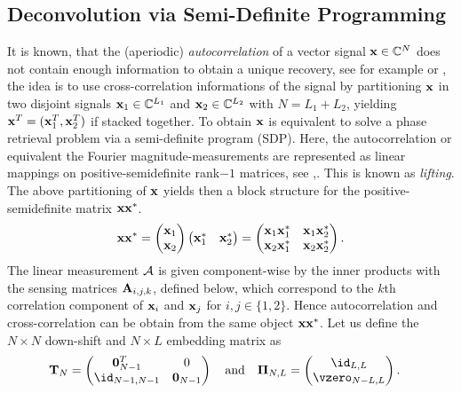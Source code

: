 \documentclass[conference]{IEEEtran}
\begin{document}
\subsection{Deconvolution via Semi-Definite Programming} It is known, that the (aperiodic) \emph{autocorrelation}
of a vector signal ${\mathbf x}\in{\ensuremath{\mathbb C}}^N$ does not contain enough information to obtain a unique recovery, see for example
\cite{WJPH17} or \cite{Hur89}, the idea is to use cross-correlation informations of the signal by partitioning ${\mathbf x}$ in
two disjoint signals ${\mathbf x}_1\in{\ensuremath{\mathbb C}}^{L_1}$ and ${\mathbf x}_2\in{\ensuremath{\mathbb C}}^{L_2}$ with $N=L_1+L_2$, yielding ${\mathbf x}^T=({\mathbf x}_1^T,{\mathbf x}_2^T)$ if
stacked together.  To obtain ${\mathbf x}$ is equivalent to solve a phase retrieval problem via a semi-definite program (SDP).
Here, the autocorrelation or equivalent the Fourier magnitude-measurements are represented as linear mappings on
positive-semidefinite rank$-1$ matrices, see \cite{JH16},\cite{Jag16}.  This is known as \emph{lifting}. The above
partitioning of ${\mathbf x}$ yields then a block structure for the positive-semidefinite matrix ${\mathbf x}{\mathbf x}^*$.  
%
\begin{align}
  {\ensuremath{\mathbf x}}{\ensuremath{\mathbf x}}^*= \begin{pmatrix}{\ensuremath{\mathbf x}}_1\\ {\mathbf x}_2\end{pmatrix}\begin{pmatrix}{\ensuremath{\mathbf x}}_1^* & {\mathbf x}_2^*\end{pmatrix}=\begin{pmatrix}
    {\ensuremath{\mathbf x}}_1{\mathbf x}_1^* & {\mathbf x}_1{\mathbf x}_2^*\\
    {\mathbf x}_2{\mathbf x}_1^* & {\mathbf x}_2{\mathbf x}_2^*\end{pmatrix}.\label{eq:xx4block}
\end{align}
\fi
%
%
The linear measurement ${\mathcal{A}}$ is given component-wise by the inner products with the sensing matrices
${\mathbf A}_{i,j,k}$, defined below, which correspond to the $k$th correlation component of ${\mathbf x}_i$ and ${\mathbf x}_j$ for
$i,j\in\{1,2\}$.
Hence autocorrelation and cross-correlation can be obtain from the same object ${\mathbf x}{\mathbf x}^*$. 
%
Let us define the $N\times N$ down-shift and $N\times L$ embedding matrix as 
%
\begin{align}
  \vT_N=
  \begin{pmatrix} \zero_{N-1}^T  & 0 \\ \id_{N-1,N-1} & \zero_{N-1}
    \end{pmatrix}
    \quad\text{and}\quad
  \ProjNL& =\begin{pmatrix}
    \id_{L, L}\\
    \vzero_{N-L, L}\end{pmatrix}.
%
\end{align}
\end{document}
